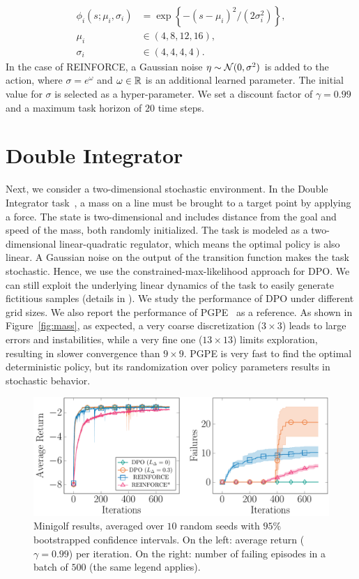 \begin{align}
\phi_i(s; \mu_i, \sigma_i) &= \exp\left\{-{(s -\mu_i)^2}\big/{(2\sigma_i^2)}\right\}, \nonumber \\
\mu_i &\in (4, 8, 12, 16), \nonumber \\
\sigma_i &\in(4, 4, 4, 4). \nonumber
\end{align}
In the case of REINFORCE, a Gaussian noise $\eta\sim\mathcal{N}(0,\sigma^2)$ is added to the action, where $\sigma=e^{\omega}$ and $\omega\in\mathbb{R}$ is an additional learned parameter. The initial value for $\sigma$ is selected as a hyper-parameter.
We set a discount factor of $\gamma=0.99$ and a maximum task horizon of $20$ time steps.

\section{Double Integrator} \label{sec:mass}
Next, we consider a two-dimensional stochastic environment. In the Double Integrator task~\citep{recht2018tour}, a mass on a line must be brought to a target point by applying a force. The state is two-dimensional and includes distance from the goal and speed of the mass, both randomly initialized. The task is modeled as a two-dimensional linear-quadratic regulator, which means the optimal policy is also linear. A Gaussian noise on the output of the transition function makes the task stochastic. Hence, we use the constrained-max-likelihood approach for \ac{DPO}. We can still exploit the underlying linear dynamics of the task to easily generate fictitious samples (details in ).
We study the performance of \ac{DPO} under different grid sizes. We also report the performance of \ac{PGPE}~\citep{sehnke2008policy} as a reference. As shown in Figure~\ref{fig:mass}, as expected, a very coarse discretization ($3\times3$) leads to large errors and instabilities, while a very fine one ($13\times13$) limits exploration, resulting in slower convergence than $9\times9$. \ac{PGPE} is very fast to find the optimal deterministic policy, but its randomization over policy parameters results in stochastic behavior.
%
\begin{figure}[t]
	\includegraphics[width=\columnwidth]{plots/minigolf.pdf}
	\caption{Minigolf results, averaged over $10$ random seeds with $95\%$ bootstrapped confidence intervals. On the left: average return ($\gamma=0.99$) per iteration. On the right: number of failing episodes in a batch of $500$ (the same legend applies).}
	\label{fig:minigolf}
\end{figure}

